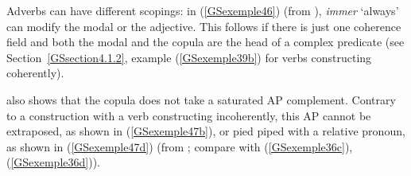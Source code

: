 \eal 
	\label{GSexemple45} 
    \label{GSexemple45a}

	\label{GSexemple45b}
\zl

\noindent
Adverbs can have different scopings: in (\ref{GSexemple46}) (from \citealt[68]{Mueller2002b}),
\emph{immer} `always' can modify the modal or the adjective. This follows if there is just one
coherence field and both the modal and the copula are the head of a complex predicate (see
Section~\ref{GSsection4.1.2}, example (\ref{GSexemple39b}) for verbs constructing coherently).

\z

\noindent
\citet{Mueller2002b} also shows that the copula does not take a saturated AP complement. Contrary to a construction with a verb constructing incoherently, this AP cannot be extraposed, as shown in (\ref{GSexemple47b}), or pied piped with a relative pronoun, as shown in (\ref{GSexemple47d}) (from \citealt[70]{Mueller2002b}; compare with (\ref{GSexemple36c}), (\ref{GSexemple36d})).   

\eal
	\label{GSexemple47} 
	\label{GSexemple47a}

	\label{GSexemple47b}
 
